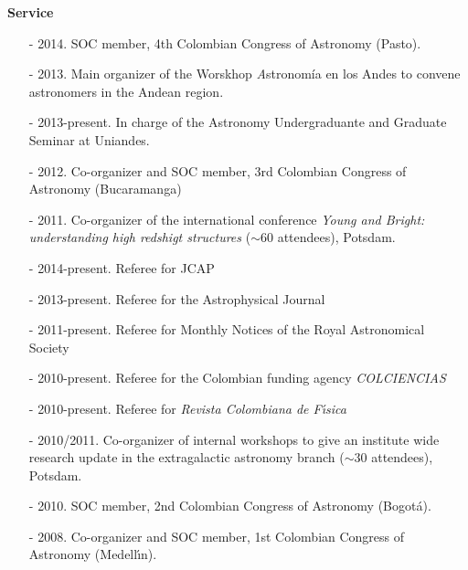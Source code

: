 \documentclass[letterpaper,11pt,onecolumn]{article}
\begin{document}
{\bf Service}
\begin{itemize}
\item[-] 2014. SOC member, 4th Colombian Congress of   Astronomy (Pasto). 
\item[-] 2013. Main organizer of the Worskhop {\textit Astronom\'ia en
  los Andes} to convene astronomers in the Andean region.  
\item[-] 2013-present. In charge of the Astronomy Undergraduante and Graduate Seminar at Uniandes. 
\item[-] 2012. Co-organizer and SOC member, 3rd Colombian Congress of
  Astronomy (Bucaramanga) 
\item[-] 2011. Co-organizer of the international conference {\it Young
  and Bright: understanding high redshigt structures} ($\sim 60$
  attendees), Potsdam. 
\item[-] 2014-present. Referee for JCAP  %
\item[-] 2013-present. Referee for the Astrophysical Journal %
\item[-] 2011-present. Referee for Monthly Notices of the Royal
  Astronomical Society %
\item[-] 2010-present. Referee for the Colombian funding agency {\it
  COLCIENCIAS} %
\item[-] 2010-present. Referee for {\it Revista Colombiana de
  F\'{\i}sica} %
\item[-] 2010/2011. Co-organizer of internal workshops to give an
  institute wide research update in the extragalactic astronomy branch
  ($\sim 30$ attendees), Potsdam. 
\item[-] 2010. SOC member, 2nd Colombian Congress of Astronomy (Bogot\'a).
\item[-] 2008. Co-organizer and SOC member, 1st Colombian Congress of
  Astronomy (Medell\'{\i}n). 
\end{itemize}
\end{document}
